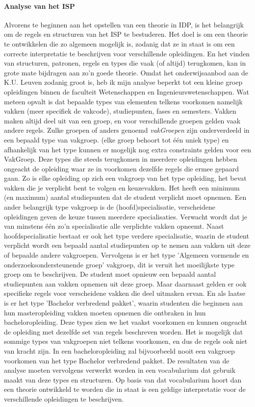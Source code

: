 \paragraph{Analyse van het ISP}
Alvorens te beginnen aan het opstellen van een theorie in IDP, is het belangrijk om de regels en structuren van het ISP te bestuderen. Het doel is om een theorie te ontwikkelen die zo algemeen mogelijk is, zodanig dat ze in staat is om een correcte interpretatie te beschrijven voor verschillende opleidingen. En het vinden van structuren, patronen, regels en types die vaak (of altijd) terugkomen, kan in grote mate bijdragen aan zo'n goede theorie. Omdat het onderwijsaanbod aan de K.U. Leuven zodanig groot is, heb ik mijn analyse beperkt tot een kleine groep opleidingen binnen de faculteit Wetenschappen en Ingenieurswetenschappen. Wat meteen opvalt is dat bepaalde types van elementen telkens voorkomen namelijk vakken (meer specifiek de vakcode), studiepunten, fases en semesters. Vakken maken altijd deel uit van een groep, en voor verschillende groepen gelden vaak andere regels. Zulke groepen of anders genoemd \textit{vakGroepen} zijn onderverdeeld in een bepaald type van vakgroep. (elke groep behoort tot \'{e}\'{e}n uniek type) en afhankelijk van het type kunnen er mogelijk nog extra constraints gelden voor een VakGroep. Deze types die steeds terugkomen in meerdere opleidingen hebben ongeacht de opleiding waar ze in voorkomen dezelfde regels die ermee gepaard gaan. Zo is elke opleiding op zich een vakgroep van het type opleiding, het bevat vakken die je verplicht bent te volgen en keuzevakken. Het heeft een minimum (en maximum) aantal studiepunten dat de student verplicht moet opnemen. Een ander belangrijk type vakgroep is de (hoofd)specialisatie, verscheidene opleidingen geven de keuze tussen meerdere specialisaties. Verwacht wordt dat je van minstens \'{e}\'{e}n zo'n specialisatie alle verplichte vakken opneemt. Naast hoofdspecialisatie bestaat er ook het type verdere specialisatie, waarin de student verplicht wordt een bepaald aantal studiepunten op te nemen aan vakken uit deze of bepaalde andere vakgroepen. Vervolgens is er het type 'Algemeen vormende en onderzoeksondersteunende groep' vakgroep, dit is veruit het moeilijkste type groep om te beschrijven. De student moet opnieuw een bepaald aantal studiepunten aan vakken opnemen uit deze groep. Maar daarnaast gelden er ook specifieke regels voor verscheidene vakken die deel uitmaken ervan. En als laatse is er het type 'Bachelor verbredend pakket', waarin studenten die beginnen aan hun masteropleiding vakken moeten opnemen die ontbraken in hun bacheloropleiding. Deze types zien we het vaakst voorkomen en kunnen ongeacht de opleiding met dezelfde set van regels beschreven worden. Het is mogelijk dat sommige types van vakgroepen niet telkens voorkomen, en dus de regels ook niet van kracht zijn. In een bacheloropleiding zal bijvoorbeeld nooit een vakgroep voorkomen van het type Bachelor verbredend pakket. De resultaten van de analyse moeten vervolgens verwerkt worden in een vocabularium dat gebruik maakt van deze types en structuren. Op basis van dat vocabularium hoort dan een theorie ontwikkeld te worden die in staat is een geldige interpretatie voor de verschillende opleidingen te beschrijven. 

